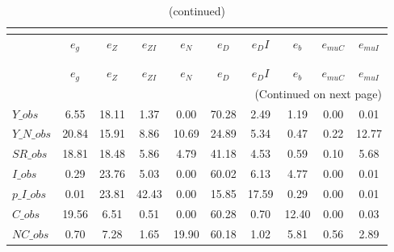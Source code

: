 
\begin{center}
\begin{longtable}{lccccccccc} 
\caption{VARIANCE DECOMPOSITION (in percent)}\\
 \label{Table:th_var_decomp_uncond}\\
\toprule 
$               $	 & 	 $        {e_g}$	 & 	 $        {e_Z}$	 & 	 $     {e_{ZI}}$	 & 	 $        {e_N}$	 & 	 $        {e_D}$	 & 	 $       {e_DI}$	 & 	 $        {e_b}$	 & 	 $    {e_{muC}}$	 & 	 $    {e_{muI}}$\\
\midrule \endfirsthead 
\caption{(continued)}\\
 \toprule \\ 
$               $	 & 	 $        {e_g}$	 & 	 $        {e_Z}$	 & 	 $     {e_{ZI}}$	 & 	 $        {e_N}$	 & 	 $        {e_D}$	 & 	 $       {e_DI}$	 & 	 $        {e_b}$	 & 	 $    {e_{muC}}$	 & 	 $    {e_{muI}}$\\
\midrule \endhead 
\midrule \multicolumn{10}{r}{(Continued on next page)} \\ \bottomrule \endfoot 
\bottomrule \endlastfoot 
$Y\_obs         $	 & 	         6.55	 & 	        18.11	 & 	         1.37	 & 	         0.00	 & 	        70.28	 & 	         2.49	 & 	         1.19	 & 	         0.00	 & 	         0.01 \\ 
$Y\_N\_obs      $	 & 	        20.84	 & 	        15.91	 & 	         8.86	 & 	        10.69	 & 	        24.89	 & 	         5.34	 & 	         0.47	 & 	         0.22	 & 	        12.77 \\ 
$SR\_obs        $	 & 	        18.81	 & 	        18.48	 & 	         5.86	 & 	         4.79	 & 	        41.18	 & 	         4.53	 & 	         0.59	 & 	         0.10	 & 	         5.68 \\ 
$I\_obs         $	 & 	         0.29	 & 	        23.76	 & 	         5.03	 & 	         0.00	 & 	        60.02	 & 	         6.13	 & 	         4.77	 & 	         0.00	 & 	         0.01 \\ 
$p\_I\_obs      $	 & 	         0.01	 & 	        23.81	 & 	        42.43	 & 	         0.00	 & 	        15.85	 & 	        17.59	 & 	         0.29	 & 	         0.00	 & 	         0.01 \\ 
$C\_obs         $	 & 	        19.56	 & 	         6.51	 & 	         0.51	 & 	         0.00	 & 	        60.28	 & 	         0.70	 & 	        12.40	 & 	         0.00	 & 	         0.03 \\ 
$NC\_obs        $	 & 	         0.70	 & 	         7.28	 & 	         1.65	 & 	        19.90	 & 	        60.18	 & 	         1.02	 & 	         5.81	 & 	         0.56	 & 	         2.89 \\ 

\end{longtable}
\end{center}
